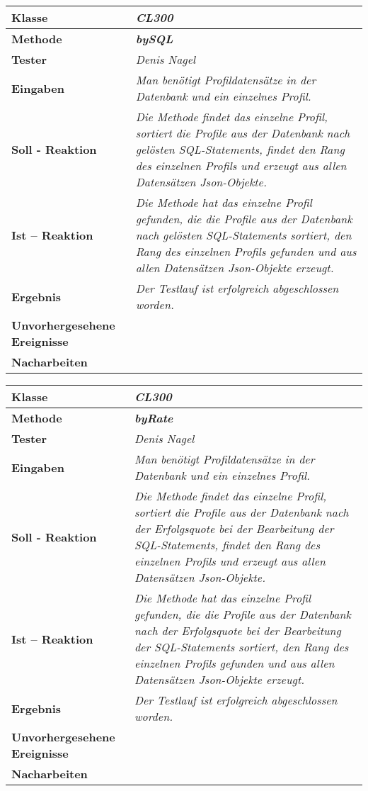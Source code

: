 \begin{longtable}{|p{4cm}|p{11cm}|}
\hline
\textbf{Klasse} & \textit{\textbf{CL300}} \\
\hline
\textbf{Methode} & \textit{\textbf{bySQL}} \\
\hline
\textbf{Tester} & \textit{Denis Nagel} \\
\hline
\textbf{Eingaben} & \textit{Man benötigt Profildatensätze in der Datenbank und ein einzelnes Profil.} \\
\hline
\textbf{Soll - Reaktion} & \textit{Die Methode findet das einzelne Profil, sortiert die Profile aus der Datenbank nach gelösten SQL-Statements, findet den Rang des einzelnen Profils und erzeugt aus allen Datensätzen Json-Objekte.} \\
\hline
\textbf{Ist -- Reaktion} & \textit{Die Methode hat das einzelne Profil gefunden, die die Profile aus der Datenbank nach gelösten SQL-Statements sortiert, den Rang des einzelnen Profils gefunden und aus allen Datensätzen Json-Objekte erzeugt.} \\
\hline
\textbf{Ergebnis} & \textit{Der Testlauf ist erfolgreich abgeschlossen worden.} \\
\hline
\textbf{Unvorhergesehene Ereignisse} &
\textit{} \\
\hline
\textbf{Nacharbeiten } & \textit{} \\
\hline
\end{longtable}

\begin{longtable}{|p{4cm}|p{11cm}|}
\hline
\textbf{Klasse} & \textit{\textbf{CL300}} \\
\hline
\textbf{Methode} & \textit{\textbf{byRate}} \\
\hline
\textbf{Tester} & \textit{Denis Nagel} \\
\hline
\textbf{Eingaben} & \textit{Man benötigt Profildatensätze in der Datenbank und ein einzelnes Profil.} \\
\hline
\textbf{Soll - Reaktion} & \textit{Die Methode findet das einzelne Profil, sortiert die Profile aus der Datenbank nach der Erfolgsquote bei der Bearbeitung der SQL-Statements, findet den Rang des einzelnen Profils und erzeugt aus allen Datensätzen Json-Objekte.} \\
\hline
\textbf{Ist -- Reaktion} & \textit{Die Methode hat das einzelne Profil gefunden, die die Profile aus der Datenbank nach der Erfolgsquote bei der Bearbeitung der SQL-Statements sortiert, den Rang des einzelnen Profils gefunden und aus allen Datensätzen Json-Objekte erzeugt.} \\
\hline
\textbf{Ergebnis} & \textit{Der Testlauf ist erfolgreich abgeschlossen worden.} \\
\hline
\textbf{Unvorhergesehene Ereignisse} &
\textit{} \\
\hline
\textbf{Nacharbeiten } & \textit{} \\
\hline
\end{longtable}

